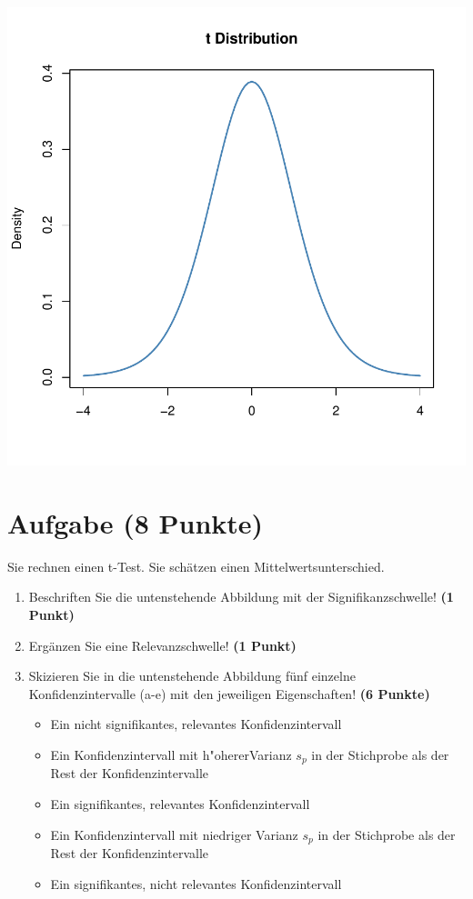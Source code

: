 \documentclass[a4paper, 10pt]{scrartcl}\usepackage[]{graphicx}\usepackage[]{xcolor}
\makeatletter
\def\maxwidth{ %
  \ifdim\Gin@nat@width>\linewidth
    \linewidth
  \else
    \Gin@nat@width
  \fi
}
\makeatother
\begin{document}
{\centering \includegraphics[width=\maxwidth]{img/statistisches-testen-3-1} 

}


 
\clearpage

\section{Aufgabe \hfill (8 Punkte)}



Sie rechnen einen t-Test. Sie sch{\"a}tzen einen Mittelwertsunterschied. 

\begin{enumerate}
\item Beschriften Sie die untenstehende Abbildung mit der
  Signifikanzschwelle! \textbf{(1 Punkt)}
\item Erg{\"a}nzen Sie eine Relevanzschwelle! \textbf{(1 Punkt)} 
\item Skizieren Sie in die
  untenstehende Abbildung f{\"u}nf einzelne Konfidenzintervalle (a-e) mit den
  jeweiligen Eigenschaften! \textbf{(6 Punkte)}
  \begin{itemize}
  \item[(a)] Ein nicht signifikantes, relevantes Konfidenzintervall 	
  \item[(b)] Ein Konfidenzintervall mit h{"o}hererVarianz $s_p$ in der Stichprobe als der Rest der Konfidenzintervalle 	
  \item[(c)] Ein signifikantes, relevantes Konfidenzintervall 	
  \item[(d)] Ein Konfidenzintervall mit niedriger Varianz $s_p$ in der Stichprobe als der Rest der Konfidenzintervalle 
  \item[(e)] Ein signifikantes, nicht relevantes Konfidenzintervall
  \end{itemize}
\end{enumerate}
\end{document}
